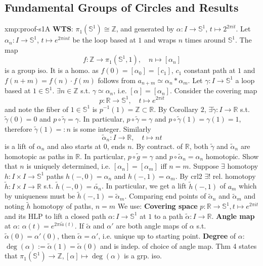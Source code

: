 \documentclass[landscape, 8pt]{extarticle}
\begin{document}
\begin{multicols*}{3}
\subsection{Fundamental Groups of Circles and Results}
\begin{xmp}{xmp:proof-s1}{A}
	\textbf{WTS}: $\pi_{1}(\mathbb{S}^{1}) \cong \mathbb{Z}$, and generated by $\alpha : I \to \mathbb{S}^{1}$, $t \mapsto 2^{2\pi i t}$.
	\tcbline
	Let $\alpha_{n} : I \to \mathbb{S}^{1}$, $t \mapsto e^{2 \pi i n t}$ be the loop based at $1$ and wraps $n$ times around $\mathbb{S}^{1}$. The map
	\[f : \mathbb{Z} \to \pi_{1}(\mathbb{S}^{1}, 1), \quad n \mapsto [\alpha_{n}]\]
	is a group iso. It is a homo. as $f(0) = [\alpha_{0}] = [c_{1}]$, $c_{1}$ constant path at $1$ and $f(n + m) = f(n) \cdot f(m)$ follows from $a_{n + m} \simeq \alpha_{n} \ast \alpha_{m}$. Let $\gamma : I \to \mathbb{S}^{1}$ a loop based at $1\in \mathbb{S}^{1}$. $\exists n \in \mathbb{Z}$ s.t. $\gamma \simeq \alpha_{n}$, i.e. $[\alpha] = [\alpha_{n}]$. Consider the covering map
	\[p : \mathbb{R} \to \mathbb{S}^{1}, \quad t \mapsto e^{2\pi i t}\]
	and note the fiber of $1\in \mathbb{S}^{1}$ is $p^{-1}(1) = \mathbb{Z} \subset \mathbb{R}$. By Corollary $2$, $\exists \! \tilde{\gamma} : I \to \mathbb{R}$ s.t. $\tilde{\gamma}(0) = 0$ and $p \circ \tilde{\gamma} = \gamma$. In particular, $p \circ \tilde{\gamma} = \gamma$ and $p \circ \tilde{\gamma}(1) = \gamma(1) = 1$, therefore $\tilde{\gamma}(1) =: n$ is some integer. Similarly
	\[\tilde{\alpha}_{n} : I \to \mathbb{R}, \quad t \mapsto nt\]
	is a lift of $\alpha_{n}$ and also starts at $0$, ends $n$. By contract. of $\mathbb{R}$, both $\tilde{\gamma}$ and $\tilde{\alpha}_{n}$ are homotopic as paths in $\mathbb{R}$. In particular, $p \circ \tilde{g} = \gamma$ and $p \circ \tilde{\alpha}_{n} = \alpha_{n}$ homotopic. Show that $n$ is uniquely determined, i.e. $[\alpha_{n}] = [\alpha_{m}]$ iff $n = m$. Suppose $\exists$ homotopy $h : I \times I \to \mathbb{S}^{1}$ paths $h(-, 0) = \alpha_{n}$ and $h(-, 1) = \alpha_{m}$. By crl2 $\exists!$ rel. homotopy $\tilde{h} : I \times I \to \mathbb{R}$ s.t. $\tilde{h}(-, 0) = \tilde{\alpha_{n}}$. In particular, we get a lift $\tilde{h}(-, 1)$ of $a_{m}$ which by uniqueness must be $\tilde{h}(-, 1) = \tilde{\alpha}_{m}$. Comparing end points of $\tilde{\alpha}_{n}$ and $\tilde{\alpha}_{m}$ and noting $\tilde{h}$ homotopy of paths, $n = m$
	\tcbline
	We use: \textbf{Covering space} $p : \mathbb{R} \to \mathbb{S}^{1}, t \mapsto e^{2\pi i t}$ and its HLP to lift a closed path $\alpha : I \to \mathbb{S}^{1}$ at $1$ to a path $\tilde{\alpha} : I \to \mathbb{R}$. \textbf{Angle map} at $\alpha$: $\alpha(t) = e^{2\pi i \tilde{a} (t)}$. If $\tilde{\alpha}$ and $\alpha'$ are both angle maps of $\alpha$ s.t. $\tilde{\alpha}(0) = \alpha'(0)$, then $\tilde{\alpha} = \alpha'$, i.e. unique up to starting point. \newline\textbf{Degree} of $\alpha$: $\deg(\alpha) := \tilde{\alpha}(1) = \tilde{\alpha}(0)$ and is indep. of choice of angle map. Thm 4 states that $\pi_{1}(\mathbb{S}^{1}) \to \mathbb{Z}, [\alpha] \mapsto \deg(\alpha)$ is a grp. iso.
\end{xmp}


\end{multicols*}
\end{document}
